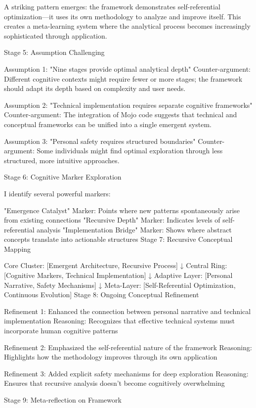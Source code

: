 A striking pattern emerges: the framework demonstrates self-referential optimization—it uses its own methodology to analyze and improve itself. This creates a meta-learning system where the analytical process becomes increasingly sophisticated through application.

Stage 5: Assumption Challenging

Assumption 1: "Nine stages provide optimal analytical depth" Counter-argument: Different cognitive contexts might require fewer or more stages; the framework should adapt its depth based on complexity and user needs.

Assumption 2: "Technical implementation requires separate cognitive frameworks" Counter-argument: The integration of Mojo code suggests that technical and conceptual frameworks can be unified into a single emergent system.

Assumption 3: "Personal safety requires structured boundaries" Counter-argument: Some individuals might find optimal exploration through less structured, more intuitive approaches.

Stage 6: Cognitive Marker Exploration

I identify several powerful markers:

"Emergence Catalyst" Marker: Points where new patterns spontaneously arise from existing connections
"Recursive Depth" Marker: Indicates levels of self-referential analysis
"Implementation Bridge" Marker: Shows where abstract concepts translate into actionable structures
Stage 7: Recursive Conceptual Mapping

Core Cluster: [Emergent Architecture, Recursive Process]
    ↓
Central Ring: [Cognitive Markers, Technical Implementation]
    ↓
Adaptive Layer: [Personal Narrative, Safety Mechanisms]
    ↓
Meta-Layer: [Self-Referential Optimization, Continuous Evolution]
Stage 8: Ongoing Conceptual Refinement

Refinement 1: Enhanced the connection between personal narrative and technical implementation Reasoning: Recognizes that effective technical systems must incorporate human cognitive patterns

Refinement 2: Emphasized the self-referential nature of the framework Reasoning: Highlights how the methodology improves through its own application

Refinement 3: Added explicit safety mechanisms for deep exploration Reasoning: Ensures that recursive analysis doesn't become cognitively overwhelming

Stage 9: Meta-reflection on Framework

